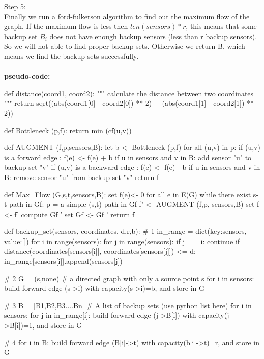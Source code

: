 \documentclass{assignment-373}
\begin{document}
\begin{enumerate}
	Step 5:\\
	\phantom{=} \phantom{=} Finally we run a ford-fulkerson algorithm to find out the maximum flow of the graph. If the maximum flow is less then $len(sensors) * r$, this means that some backup set $B_{i}$ does not have enough backup sensors (less than r backup sensors). So we will not able to find proper backup sets. Otherwise we return B, which means we find the backup sets successfully.\\\\
	
	\textbf{pseudo-code:}  
    \begin{python}
def distance(coord1, coord2):
	"""
	calculate the distance between two coordinates
	"""
 	return sqrt((abs(coord1[0] - coord2[0]) ** 2) + 
 	(abs(coord1[1] - coord2[1]) ** 2))


def Bottleneck (p,f):
    return min (cf(u,v))


def AUGMENT (f,p,sensors,B):
    let b <- Bottleneck (p,f)
    for all (u,v) in p:
        if (u,v) is a forward edge :
            f(e) <- f(e) + b
            if u in sensors and v in B:
                add sensor "u" to backup set "v"
        if (u,v) is a backward edge :
            f(e) <- f(e) - b
            if u in sensors and v in B:
                remove sensor "u" from backup set "v"
    return f


def Max_Flow (G,s,t,sensors,B):
    set f(e)<- 0 for all e in E(G)
    while there exist s-t path in Gf:
        p = a simple (s,t) path in Gf
        f' <- AUGMENT (f,p, sensors,B)
        set f <- f'
        compute Gf '
        set Gf <- Gf '
    return f


def backup_set(sensors, coordinates, d,r,b):
    # 1
    in_range = dict(key:sensors,  value:[])
    for i in range(sensors):
        for j in range(sensors):
            if j == i:
                continue
            if distance(coordinates[sensors[i]],
             coordinates[sensors[j]]) <= d:
                in_range[sensors[i]].append(sensors[j])
    
    # 2
    G  = (s,none) # a directed graph with only a source point s
    for i in sensors:
        build forward edge (s->i) with capacity(s->i)=b, and store in G
    
    # 3
    B = [B1,B2,B3....Bn] # A list of backup sets (use python list here)
    for i in sensors:
        for j in in_range[i]:
            build forward edge (j->B[i]) with capacity(j->B[i])=1, and store in G
     
    # 4
    for i in B:
        build forward edge (B[i]->t) with capacity(b[i]->t)=r, and store in G
    

\end{python}
\end{enumerate}
\end{document}
